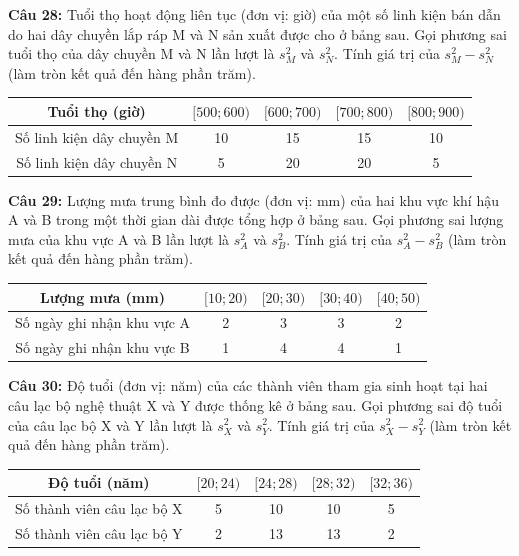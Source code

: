 \documentclass[12pt]{article}
\begin{document}
	\vspace{4mm}
	
	\noindent \textbf{Câu 28:} Tuổi thọ hoạt động liên tục (đơn vị: giờ) của một số linh kiện bán dẫn do hai dây chuyền lắp ráp M và N sản xuất được cho ở bảng sau. Gọi phương sai tuổi thọ của dây chuyền M và N lần lượt là $s_M^2$ và $s_N^2$. Tính giá trị của $s_M^2 - s_N^2$ (làm tròn kết quả đến hàng phần trăm).
	\begin{center}
		\renewcommand{\arraystretch}{1.3}
		\begin{tabular}{|c|c|c|c|c|}
			\hline
			Tuổi thọ (giờ) & $[500; 600)$ & $[600; 700)$ & $[700; 800)$ & $[800; 900)$ \\
			\hline
			Số linh kiện dây chuyền M & 10 & 15 & 15 & 10 \\
			\hline
			Số linh kiện dây chuyền N & 5 & 20 & 20 & 5 \\
			\hline
		\end{tabular}
	\end{center}
	
	\vspace{4mm}
	
	\noindent \textbf{Câu 29:} Lượng mưa trung bình đo được (đơn vị: mm) của hai khu vực khí hậu A và B trong một thời gian dài được tổng hợp ở bảng sau. Gọi phương sai lượng mưa của khu vực A và B lần lượt là $s_A^2$ và $s_B^2$. Tính giá trị của $s_A^2 - s_B^2$ (làm tròn kết quả đến hàng phần trăm).
	\begin{center}
		\renewcommand{\arraystretch}{1.3}
		\begin{tabular}{|c|c|c|c|c|}
			\hline
			Lượng mưa (mm) & $[10; 20)$ & $[20; 30)$ & $[30; 40)$ & $[40; 50)$ \\
			\hline
			Số ngày ghi nhận khu vực A & 2 & 3 & 3 & 2 \\
			\hline
			Số ngày ghi nhận khu vực B & 1 & 4 & 4 & 1 \\
			\hline
		\end{tabular}
	\end{center}
	
	\vspace{4mm}
	
	\noindent \textbf{Câu 30:} Độ tuổi (đơn vị: năm) của các thành viên tham gia sinh hoạt tại hai câu lạc bộ nghệ thuật X và Y được thống kê ở bảng sau. Gọi phương sai độ tuổi của câu lạc bộ X và Y lần lượt là $s_X^2$ và $s_Y^2$. Tính giá trị của $s_X^2 - s_Y^2$ (làm tròn kết quả đến hàng phần trăm).
	\begin{center}
		\renewcommand{\arraystretch}{1.3}
		\begin{tabular}{|c|c|c|c|c|}
			\hline
			Độ tuổi (năm) & $[20; 24)$ & $[24; 28)$ & $[28; 32)$ & $[32; 36)$ \\
			\hline
			Số thành viên câu lạc bộ X & 5 & 10 & 10 & 5 \\
			\hline
			Số thành viên câu lạc bộ Y & 2 & 13 & 13 & 2 \\
			\hline
		\end{tabular}
	\end{center}
	
\end{document}
